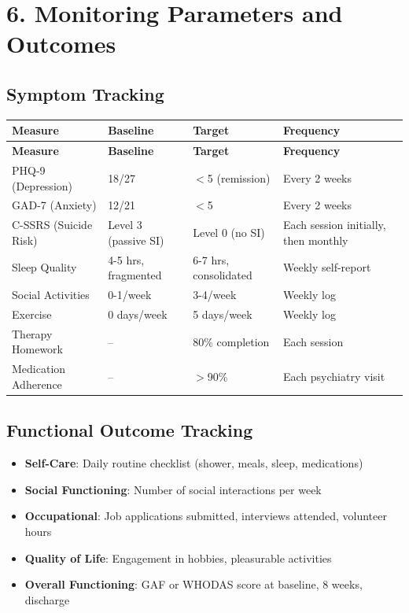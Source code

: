 \documentclass[11pt,letterpaper]{article}
\begin{document}
\section*{6. Monitoring Parameters and Outcomes}

\subsection*{Symptom Tracking}

\begin{longtable}{|p{4cm}|p{2.5cm}|p{2.5cm}|p{4.5cm}|}
\hline
\textbf{Measure} & \textbf{Baseline} & \textbf{Target} & \textbf{Frequency} \\ \hline
\endfirsthead
\hline
\textbf{Measure} & \textbf{Baseline} & \textbf{Target} & \textbf{Frequency} \\ \hline
\endhead
PHQ-9 (Depression) & 18/27 & $<$5 (remission) & Every 2 weeks \\ \hline
GAD-7 (Anxiety) & 12/21 & $<$5 & Every 2 weeks \\ \hline
C-SSRS (Suicide Risk) & Level 3 (passive SI) & Level 0 (no SI) & Each session initially, then monthly \\ \hline
Sleep Quality & 4-5 hrs, fragmented & 6-7 hrs, consolidated & Weekly self-report \\ \hline
Social Activities & 0-1/week & 3-4/week & Weekly log \\ \hline
Exercise & 0 days/week & 5 days/week & Weekly log \\ \hline
Therapy Homework & -- & 80\% completion & Each session \\ \hline
Medication Adherence & -- & $>$90\% & Each psychiatry visit \\ \hline
\end{longtable}

\subsection*{Functional Outcome Tracking}

\begin{itemize}[leftmargin=*]
    \item \textbf{Self-Care}: Daily routine checklist (shower, meals, sleep, medications)
    \item \textbf{Social Functioning}: Number of social interactions per week
    \item \textbf{Occupational}: Job applications submitted, interviews attended, volunteer hours
    \item \textbf{Quality of Life}: Engagement in hobbies, pleasurable activities
    \item \textbf{Overall Functioning}: GAF or WHODAS score at baseline, 8 weeks, discharge
\end{itemize}
\end{document}
